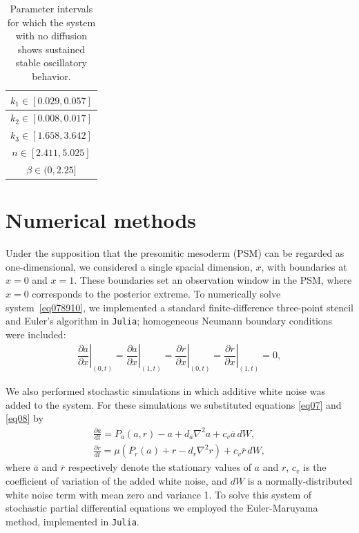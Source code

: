 \documentclass[%
 preprint,
 amsmath,amssymb,
 aps,
]{revtex4-2}
\begin{document}
	\begin{table}[h] 
		\centering
		\begin{tabular}{|c|} \hline
			$k_1  \in [0.029, 0.057]$ \\ \hline
			$k_2  \in [0.008, 0.017]$ \\ \hline 
			$k_3  \in [1.658, 3.642]$ \\ \hline
			$n  \in  [2.411, 5.025]$ \\  \hline
			$\beta  \in  (0, 2.25]$ \\   \hline
		\end{tabular} 
		
		\caption{Parameter intervals for which the system with no diffusion shows
			sustained stable oscillatory behavior.}
		\label{Tab01}
	\end{table}
	
	\section{Numerical methods}
	\label{numer}
	
	Under the supposition that the presomitic mesoderm (PSM) can be regarded as
	one-dimensional, we considered a single spacial dimension, $x$, with boundaries
	at $x=0$ and $x=1$. These boundaries set an observation window in the PSM, where
	$x=0$ corresponds to the posterior extreme. To numerically solve
	system~\eqref{eq078910}, we implemented a standard finite-difference three-point
	stencil and Euler's algorithm in \texttt{Julia}; homogeneous Neumann boundary
	conditions were included:
	\begin{gather}\label{eqbn}
	\left. \dfrac{\partial a}{\partial x}\right|_{(0, t)} = 
	\left. \dfrac{\partial a}{\partial x}\right|_{(1, t)} = 
	\left. \dfrac{\partial r}{\partial x}\right|_{(0, t)} =
	\left. \dfrac{\partial r}{\partial x}\right|_{(1, t)} = 0 ,
	\end{gather}
		
	We also performed stochastic simulations in which additive white noise was added
	to the system. For these simulations we substituted equations \eqref{eq07} and
	\eqref{eq08} by
	\begin{subequations}\label{eq1112}
		\begin{gather}
		\frac{\partial a}{dt} = P_a(a, r) - a + d_a \nabla^2 a + c_v \overline{a} \,
		dW, \label{eq11} \\
		\frac{\partial r}{dt}= \mu (P_r(a) + r - d_r \nabla^2 r) + c_v \overline{r} \,
		dW, \label{eq12}
		\end{gather}
	\end{subequations}
	where $\overline{a}$ and $\overline{r}$ respectively denote the stationary
	values of  $a$ and $r$, $c_v$ is the coefficient of variation of the added white
	noise, and $dW$ is a normally-distributed white noise term with mean zero and
	variance 1. To solve this system of stochastic partial differential equations we
	employed the Euler-Maruyama method, implemented in \texttt{Julia}.
	
\end{document}
